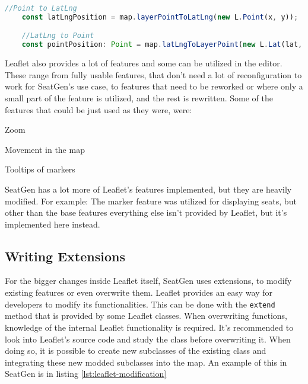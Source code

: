 \begin{lstlisting}[language=TypeScript, caption={Latitude Longitude and Point conversion}, label={lst:latlng-point}]
    //Point to LatLng
    const latLngPosition = map.layerPointToLatLng(new L.Point(x, y));

    //LatLng to Point
    const pointPosition: Point = map.latLngToLayerPoint(new L.Lat(lat, lng));
\end{lstlisting}

Leaflet also provides a lot of features and some can be utilized in the editor. These range from fully usable features, that don't need a lot of reconfiguration to work for SeatGen's use case, to features that need to be reworked or where only a small part of the feature is utilized, and the rest is rewritten. Some of the features that could be just used as they were, were:
\begin{compactitem}
\item Zoom
\item Movement in the map
\item Tooltips of markers
\end{compactitem} 

SeatGen has a lot more of Leaflet's features implemented, but they are heavily modified. For example: The marker feature was utilized for displaying seats, but other than the base features everything else isn't provided by Leaflet, but it's implemented here instead.

\subsection{Writing Extensions}
For the bigger changes inside Leaflet itself, SeatGen uses extensions, to modify existing features or even overwrite them. Leaflet provides an easy way for developers to modify its functionalities. This can be done with the \texttt{extend} method that is provided by some Leaflet classes. When overwriting functions, knowledge of the internal Leaflet functionality is required. It's recommended to look into Leaflet's source code and study the class before overwriting it. When doing so, it is possible to create new subclasses of the existing class and integrating these new modded subclasses into the map. An example of this in SeatGen is in listing \ref{lst:leaflet-modification}

